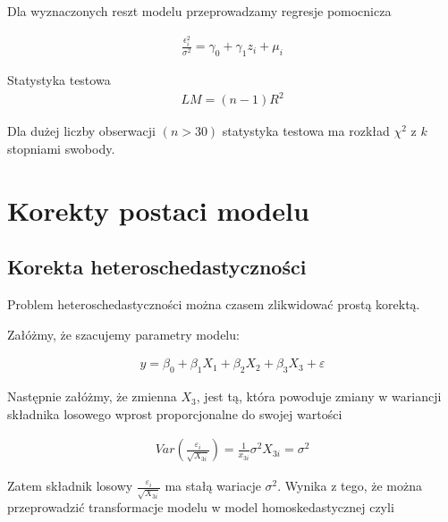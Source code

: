 Dla wyznaczonych reszt modelu przeprowadzamy regresje pomocnicza

\begin{equation}
    \begin{split}
        \frac{\epsilon_{i}^{2}}{\sigma^2} = \gamma_{0} + \gamma_{1}z_{i} + \mu_{i}
    \end{split}
\end{equation}

Statystyka testowa
\begin{equation}
    \begin{split}
        LM = (n-1)R^{2}
    \end{split}
\end{equation}

Dla dużej liczby obserwacji \((n > 30)\) statystyka testowa ma rozkład \(\chi^{2}\) z \(k\) stopniami swobody.


\section{Korekty postaci modelu}\label{sec:korekty-postaci-modelu}

\subsection{Korekta heteroschedastyczności}\label{subsec:korekta-heteroschedastyczności---transformacja-modelu}

Problem heteroschedastyczności można czasem zlikwidować prostą korektą.

Załóżmy, że szacujemy parametry modelu:

\begin{equation}
    \begin{split}
        y = \beta_{0} +\beta_{1}X_{1} + \beta_{2}X_{2} +\beta_{3}X_{3} + \varepsilon
    \end{split}
\end{equation}

Następnie załóżmy, że zmienna \( X_{3}\), jest tą, która powoduje zmiany w wariancji składnika losowego wprost proporcjonalne do swojej wartości

\begin{equation}
    \begin{split}
        Var(\frac{\varepsilon_{i}}{\sqrt{X_{3i}}}) = \frac{1}{x_{3i}}\sigma^{2}X_{3i}=\sigma^2
    \end{split}
\end{equation}

Zatem składnik losowy \( \frac{\varepsilon_{i}}{\sqrt{X_{3i}}}\) ma stałą wariacje \(\sigma^{2}\).
Wynika z tego, że można przeprowadzić transformacje modelu w model homoskedastycznej czyli

